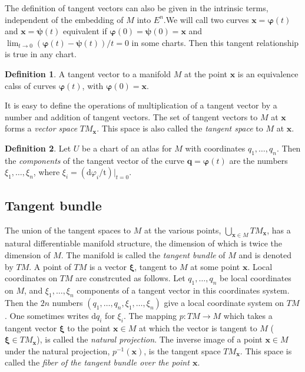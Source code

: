 \documentclass[conference]{IEEEtran}
\theoremstyle{definition}
\newtheorem{definition}{Definition}[section]
\theoremstyle{remark}
\begin{document}
    The definition of tangent vectors can also be given in the intrinsic terms, independent of the embedding of $M$ into $E^n$.We will call two curves $\mathbf{x} = \bm{\varphi}(t)$ and $\mathbf{x} = \bm{\psi}(t)$ equivalent if $\bm{\varphi}(0) = \bm{\psi}(0) = \mathbf{x}$ and $\lim_{t \to 0} (\bm{\varphi}(t) - \bm{\psi}(t)) / t = 0$ in some charts. Then this tangent relationship is true in any chart.

    \begin{definition}
        A tangent vector to a manifold $M$ at the point $\mathbf{x}$ is an equivalence calss of curves $\bm{\varphi}(t)$, with $\bm{\varphi}(0) = \mathbf{x}$.
    \end{definition}

    It is easy to define the operations of multiplication of a tangent vector by a number and addition of tangent vectors. The set of tangent vectors to $M$ at $\mathbf{x}$ forms a \emph{vector space} $TM_\mathbf{x}$. This space is also called the \emph{tangent space} to $M$ at $\mathbf{x}$.

    \begin{definition}
        Let $U$ be a chart of an atlas for $M$ with coordinates $q_1, \dots, q_n$. Then the \emph{components} of the tangent vector of the curve $\mathbf{q} = \bm{\varphi}(t)$ are the numbers $\xi_1, \dots, \xi_n$, where $\xi_i = (\mathrm{d} \varphi_i / \mathrm{t})|_{t = 0}$.
    \end{definition}

    \subsection{Tangent bundle}
    The union of the tangent spaces to $M$ at the various points, $\bigcup_{\mathbf{x} \in M} TM_{\mathbf{x}}$, has a natural differentiable manifold structure, the dimension of which is twice the dimension of $M$. The manifold is called the \emph{tangent bundle} of $M$ and is denoted by $TM$. A point of $TM$ is a vector $\bm{\xi}$, tangent to $M$ at some point $\mathbf{x}$. Local coordinates on $TM$ are constrcuted as follows. Let $q_1, \dots, q_n$ be local coordinates on $M$, and $\xi_1, \dots, \xi_n$ components of a tangent vector in this coordinates system. Then the $2n$ numbers $(q_1, \dots, q_n, \xi_1, \dots, \xi_n)$ give a local coordinate system on $TM$. One sometimes writes $\mathrm{d} q_i$ for $\xi_i$. The mapping $p: TM \to M$ which takes a tangent vector $\bm{\xi}$ to the point $\mathbf{x} \in M$ at which the vector is tangent to $M$ ($\bm{\xi} \in TM_{\mathbf{x}}$), is called the \emph{natural projection}. The inverse image of a point $\mathbf{x} \in M$ under the natural projection, $p^{-1}(\mathbf{x})$, is the tangent space $TM_{\mathbf{x}}$. This space is called the \emph{fiber of the tangent bundle over the point $\mathbf{x}$}.
\end{document}
